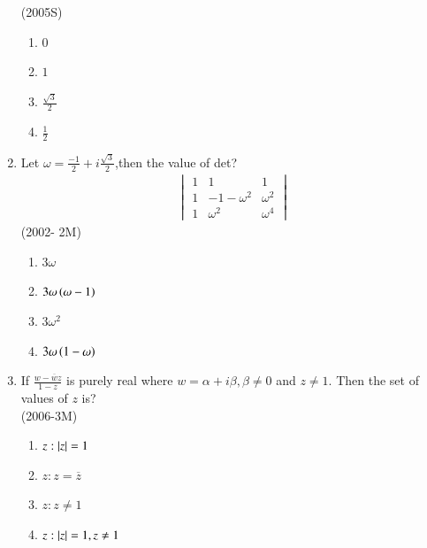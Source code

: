 \documentclass[journal,12pt,twocolumn]{IEEEtran}
\theoremstyle{remark}
\begin{document}
\begin{enumerate}
        \hfill{(2005S)}
		\begin{multicols}{4}
\begin{enumerate}[label=(\alph*)]
	\item $0$
	\item $1$
	\item $\frac{\sqrt{3}}{2}$
	\item $\frac{1}{2}$
\end{enumerate}
                 \end{multicols}

\item Let $\omega=\frac{-1}{2}+i\frac{\sqrt{3}}{2}$,then the value of det?\\
	\begin{align}
	\begin{vmatrix}
	1     &1               &1            \\
	1     &-1-\omega^{2}   &\omega^{2}   \\
	1     &\omega^{2}      &\omega^{4}
        \end{vmatrix}
	\end{align}
	\hfill{(2002- 2M)}
		\begin{multicols}{2}
\begin{enumerate}[label=(\alph*)]
	\item $3\omega$
	\item $3\omega\left(\omega-1\right)$
	\item $3\omega^{2}$
	\item $3\omega\left(1-\omega\right)$
\end{enumerate}
		\end{multicols}

\item If $\frac{w-\overline{w}z}{1-z}$ is purely real where $w=\alpha+i\beta, \beta \neq 0$ and $z \neq 1$. Then the set of values of $z$ is?                     \\

	\hfill{(2006-3M)}
		\begin{multicols}{2}
\begin{enumerate}[label=(\alph*)]
	\item {$z:\left\vert z\right\vert=1$}
	\item {$z:z= \overline{z}$}
	\item {$z:z \neq 1 $}
	\item {$z:\left\vert z\right\vert=1, z\neq1$}
\end{enumerate}
		\end{multicols}


\end{enumerate}
\end{document}
